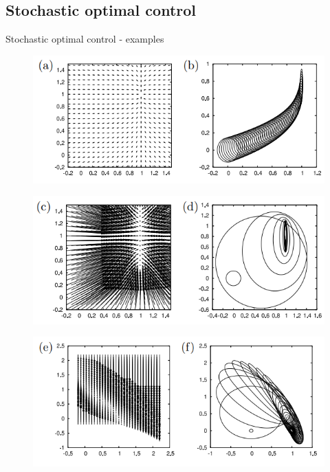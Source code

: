 \documentclass[]{beamer}
\theoremstyle{definition}
\begin{document}
\subsection{Stochastic optimal control}
\begin{frame}{Stochastic optimal control - examples}
    \begin{figure}
        \centering
        \includegraphics[height=0.25\textheight]{figs/fig_4ab_control_example.png}
        \label{fig:my_label}
    \end{figure}
    \begin{figure}
        \centering
        \includegraphics[height=0.25\textheight]{figs/fig_4cd_control_example.png}
        \label{fig:my_label}
    \end{figure}
    \begin{figure}
        \centering
        \includegraphics[height=0.25\textheight]{figs/fig_4ef_control_example.png}

\end{figure}
\end{frame}
\end{document}
